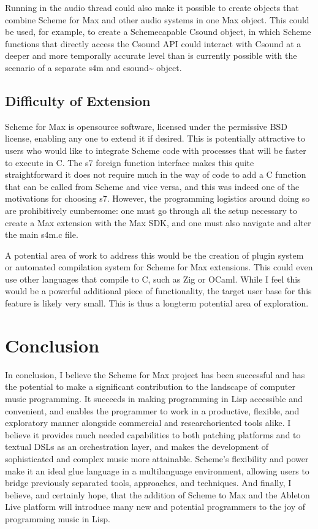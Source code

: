 \documentclass[letterpaper,10pt,english]{sphinxmanual}
\begin{document}
\sphinxAtStartPar
Running in the audio thread could also make it possible to create objects
that combine Scheme for Max and other audio systems in one Max object.
This could be used, for example, to create a Scheme\sphinxhyphen{}capable Csound object,
in which Scheme functions that directly access the Csound API could interact
with Csound at a deeper and more temporally accurate level than is currently possible
with the scenario of a separate s4m and csound\textasciitilde{} object.


\subsection{Difficulty of Extension}
\label{\detokenize{conclusion:difficulty-of-extension}}
\sphinxAtStartPar
Scheme for Max is open\sphinxhyphen{}source software, licensed under the permissive BSD license,
enabling any one to extend it if desired.
This is potentially attractive to users who would like to integrate Scheme code
with processes that will be faster to execute in C.
The s7 foreign function interface makes this quite straightforward \sphinxhyphen{} it does not
require much in the way of code to add a C function that can be called from
Scheme and vice versa, and this was indeed one of the motivations for choosing s7.
However, the programming logistics around doing so are prohibitively cumbersome:
one must go through all the setup necessary to create a Max extension with the
Max SDK, and one must also navigate and alter the main s4m.c file.

\sphinxAtStartPar
A potential area of work to address this would be the creation of plugin system
or automated compilation system for Scheme for Max extensions.
This could even use other languages that compile to C, such as Zig or OCaml.
While I feel this would be a powerful additional piece of functionality,
the target user base for this feature is likely very small.
This is thus a long\sphinxhyphen{}term potential area of exploration.


\section{Conclusion}
\label{\detokenize{conclusion:id1}}
\sphinxAtStartPar
In conclusion, I believe the Scheme for Max project has been successful and has the potential
to make a significant contribution to the landscape of computer music programming.
It succeeds in making programming in Lisp accessible and convenient, and enables
the programmer to work in a productive, flexible, and exploratory manner alongside
commercial and research\sphinxhyphen{}oriented tools alike.
I believe it provides much needed capabilities
to both patching platforms and to textual DSLs as an orchestration layer, and makes
the development of sophisticated and complex music more attainable.
Scheme’s flexibility and power make it an ideal glue language
in a multi\sphinxhyphen{}language environment, allowing users to bridge previously separated
tools, approaches, and techniques.
And finally, I believe, and certainly hope, that the addition of Scheme to Max and
the Ableton Live platform will introduce many new and potential programmers to the
joy of programming music in Lisp.
\end{document}
